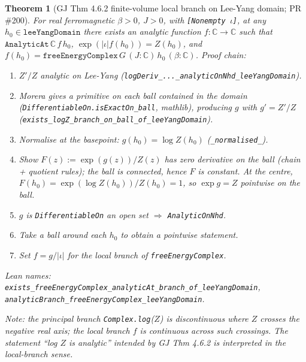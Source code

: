 \documentclass[a4paper,11pt]{article}
\newtheorem{theorem}{Theorem}
\begin{document}
\begin{theorem}[GJ Thm 4.6.2 finite-volume local branch on Lee-Yang domain; PR \#200]
For real ferromagnetic $\beta > 0$, $J > 0$, with
\texttt{[Nonempty }$\iota$\texttt{]}, at any
$h_0 \in \texttt{leeYangDomain}$ there exists an analytic function
$f : \mathbb C \to \mathbb C$ such that
$\texttt{AnalyticAt}\,\mathbb C\,f\,h_0$,
$\exp(|\iota| f(h_0)) = Z(h_0)$, and
$f(h_0) = \texttt{freeEnergyComplex}\,G\,(J:\mathbb C)\,h_0\,(\beta:\mathbb C)$.
Proof chain:
\begin{enumerate}
\item $Z'/Z$ analytic on Lee-Yang (\texttt{logDeriv\_...\_analyticOnNhd\_leeYangDomain}).
\item Morera gives a primitive on each ball contained in the domain
  (\texttt{DifferentiableOn.isExactOn\_ball}, mathlib), producing $g$
  with $g' = Z'/Z$ (\texttt{exists\_logZ\_branch\_on\_ball\_of\_leeYangDomain}).
\item Normalise at the basepoint: $g(h_0) = \log Z(h_0)$
  (\texttt{\_normalised\_}).
\item Show $F(z) := \exp(g(z))/Z(z)$ has zero derivative on the ball
  (chain + quotient rules); the ball is connected, hence $F$ is
  constant. At the centre, $F(h_0) = \exp(\log Z(h_0))/Z(h_0) = 1$,
  so $\exp g = Z$ pointwise on the ball.
\item $g$ is \texttt{DifferentiableOn} an open set $\Rightarrow$
  \texttt{AnalyticOnNhd}.
\item Take a ball around each $h_0$ to obtain a pointwise statement.
\item Set $f = g / |\iota|$ for the local branch of
  \texttt{freeEnergyComplex}.
\end{enumerate}
Lean names: \texttt{exists\_freeEnergyComplex\_analyticAt\_branch\_of\_leeYangDomain},
\texttt{analyticBranch\_freeEnergyComplex\_leeYangDomain}.

Note: the principal branch \texttt{Complex.log}($Z$) is discontinuous
where $Z$ crosses the negative real axis; the local branch $f$ is
continuous across such crossings. The statement
``log $Z$ is analytic'' intended by GJ Thm 4.6.2 is interpreted in the
local-branch sense.
\end{theorem}
\end{document}

